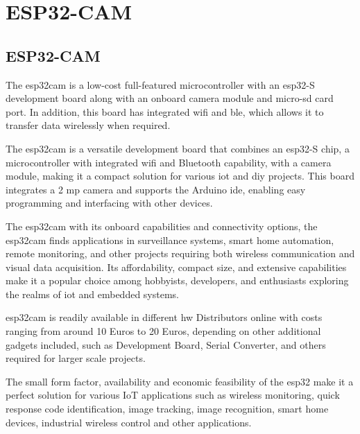 

\chapter{ESP32-CAM}\label{ESP32description}

\section{ESP32-CAM}\label{ESP32description}

The \ac{esp32cam} is a low-cost full-featured microcontroller with an \ac{esp32}-S development board along with an onboard camera module and micro-\ac{sd} card port. In addition, this board has integrated \ac{wifi} and \ac{ble}, which allows it to transfer data wirelessly when required.

\medskip

The \ac{esp32cam} is a versatile development board that combines an \ac{esp32}-S chip, a microcontroller with integrated \ac{wifi} and Bluetooth capability, with a camera module, making it a compact solution for various \ac{iot} and \ac{diy} projects. This board integrates a 2 \ac{mp} camera and supports the Arduino \ac{ide}, enabling easy programming and interfacing with other devices. 

\medskip

The \ac{esp32cam} with its onboard capabilities and connectivity options, the \ac{esp32cam} finds applications in surveillance systems, smart home automation, remote monitoring, and other projects requiring both wireless communication and visual data acquisition. Its affordability, compact size, and extensive capabilities make it a popular choice among hobbyists, developers, and enthusiasts exploring the realms of \ac{iot} and embedded systems.

\medskip

\ac{esp32cam} is readily available in different \ac{hw} Distributors online with costs ranging from around 10 Euros to 20 Euros, depending on other additional gadgets included, such as Development Board, Serial Converter, and others required for larger scale projects.

\medskip

The small form factor, availability and economic feasibility of the \ac{esp32} make it a perfect solution for various IoT applications such as wireless monitoring, quick response code identification, image tracking, image recognition, smart home devices, industrial wireless control and other applications.

